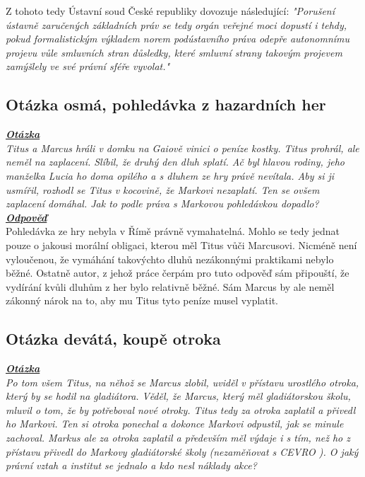 \documentclass{article}
\begin{document}
Z tohoto tedy Ústavní soud České republiky dovozuje následující: \textit{"Porušení ústavně zaručených základních práv se tedy orgán veřejné moci dopustí i tehdy, pokud formalistickým výkladem norem podústavního práva odepře autonomnímu projevu vůle smluvních stran důsledky, které smluvní strany takovým projevem zamýšlely ve své právní sféře vyvolat."}\\



\subsection{Otázka osmá, pohledávka z hazardních her}
\textbf{\textit{\underline{Otázka}}}\\
\textit{Titus a Marcus hráli v domku na Gaiově vinici o peníze kostky. Titus prohrál, ale neměl na zaplacení. Slíbil, že druhý den dluh splatí. Ač byl hlavou rodiny, jeho manželka Lucia ho doma opilého a s dluhem ze hry právě nevítala. Aby si ji usmířil, rozhodl se Titus v kocovině, že Markovi nezaplatí. Ten se ovšem zaplacení domáhal. Jak to podle práva s Markovou pohledávkou dopadlo?}\\

\noindent\noindent\textbf{\textit{\underline{Odpověď}}}\\

Pohledávka ze hry nebyla v Římě právně vymahatelná. Mohlo se tedy jednat pouze o jakousi morální obligaci, kterou měl Titus vůči Marcusovi. Nicméně není vyloučenou, že vymáhání takovýchto dluhů nezákonnými praktikami nebylo běžné. Ostatně autor, z jehož práce čerpám pro tuto odpověď sám připouští, že vydírání kvůli dluhům z her bylo relativně běžné. Sám Marcus by ale neměl zákonný nárok na to, aby mu Titus tyto peníze musel vyplatit.

\newpage

\subsection{Otázka devátá, koupě otroka}
\textbf{\textit{\underline{Otázka}}}\\
\textit{Po tom všem Titus, na něhož se Marcus zlobil, uviděl v přístavu urostlého otroka, který by se hodil na gladiátora. Věděl, že Marcus, který měl gladiátorskou školu, mluvil o tom, že by potřeboval nové otroky. Titus tedy za otroka zaplatil a přivedl ho Markovi. Ten si otroka ponechal a dokonce Markovi odpustil, jak se minule zachoval. Markus ale za otroka zaplatil a především měl výdaje i s tím, než ho z přístavu přivedl do Markovy gladiátorské školy (nezaměňovat s CEVRO ). O jaký právní vztah a institut se jednalo a kdo nesl náklady akce?}\\
\end{document}
